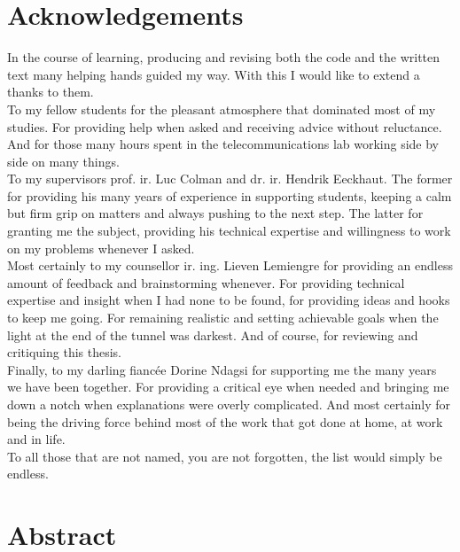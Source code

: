\documentclass[11pt,british]{article}
\begin{document}
\section*{Acknowledgements}
In the course of learning, producing and revising both the code and the written text many helping hands guided my way. With this I would like to extend a thanks to them.
\\[\baselineskip]
To my fellow students for the pleasant atmosphere that dominated most of my studies. For providing help when asked and receiving advice without reluctance. And for those many hours spent in the telecommunications lab working side by side on many things.
\\[\baselineskip]
To my supervisors prof. ir. Luc Colman and dr. ir. Hendrik Eeckhaut. The former for providing his many years of experience in supporting students, keeping a calm but firm grip on matters and always pushing to the next step. The latter for granting me the subject, providing his technical expertise and willingness to work on my problems whenever I asked.
\\[\baselineskip]
Most certainly to my counsellor ir. ing. Lieven Lemiengre for providing an endless amount of feedback and brainstorming whenever. For providing technical expertise and insight when I had none to be found, for providing ideas and hooks to keep me going. For remaining realistic and setting achievable goals when the light at the end of the tunnel was darkest. And of course, for reviewing and critiquing this thesis.
\\[\baselineskip]
Finally, to my darling fianc\'{e}e Dorine Ndagsi for supporting me the many years we have been together. For providing a critical eye when needed and bringing me down a notch when explanations were overly complicated. And most certainly for being the driving force behind most of the work that got done at home, at work and in life.
\\[\baselineskip]
To all those that are not named, you are not forgotten, the list would simply be endless.

\pagebreak{}


\newpage{}
\section*{Abstract}
\end{document}
